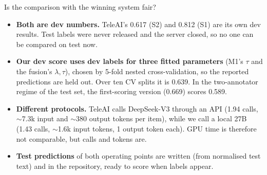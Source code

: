 
\begin{frame}{Is the comparison with the winning system fair?}
  \small
  \begin{itemize}\setlength{\itemsep}{1.5mm}
    \item \textbf{Both are dev numbers.} TeleAI's 0.617 (S2) and 0.812 (S1) are its own dev results. Test labels were never released and the server closed, so no one can be compared on test now.
    \item \textbf{Our dev score uses dev labels for three fitted parameters} (M1's $\tau$ and the fusion's $\lambda,\tau$), chosen by 5-fold nested cross-validation, so the reported predictions are held out. Over ten CV splits it is 0.639. In the two-annotator regime of the test set, the first-scoring version (0.669) scores 0.589.
    \item \textbf{Different protocols.} TeleAI calls DeepSeek-V3 through an API (1.94 calls, ${\sim}$7.3k input and ${\sim}$380 output tokens per item), while we call a local 27B (1.43 calls, ${\sim}$1.6k input tokens, 1 output token each). GPU time is therefore not comparable, but calls and tokens are.
    \item \textbf{Test predictions} of both operating points are written (from normalised test text) and in the repository, ready to score when labels appear.
  \end{itemize}
\end{frame}

